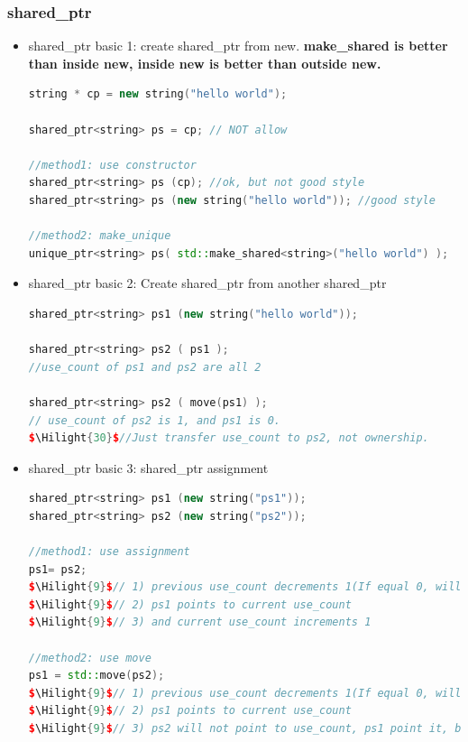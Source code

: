\documentclass[a4paper,12pt,twoside]{book}
\newcommand{\Hilight}[1]{\makebox[0pt][l]{\color{yellow}\rule[-3pt]{#1em}{11pt}}}
\begin{document}
\subsubsection{shared\_ptr}
\begin{itemize}

\item shared\_ptr basic 1: create shared\_ptr from new.    \textbf{make\_shared is better than inside new, inside new is better than outside new.}
\begin{lstlisting}[frame=single, language=c++]
string * cp = new string("hello world");

shared_ptr<string> ps = cp; // NOT allow

//method1: use constructor
shared_ptr<string> ps (cp); //ok, but not good style
shared_ptr<string> ps (new string("hello world")); //good style

//method2: make_unique
unique_ptr<string> ps( std::make_shared<string>("hello world") );
\end{lstlisting}

\item shared\_ptr basic 2: Create shared\_ptr from another shared\_ptr
\begin{lstlisting}[frame=single, language=c++, mathescape=true]
shared_ptr<string> ps1 (new string("hello world"));

shared_ptr<string> ps2 ( ps1 );
//use_count of ps1 and ps2 are all 2

shared_ptr<string> ps2 ( move(ps1) );
// use_count of ps2 is 1, and ps1 is 0.
$\Hilight{30}$//Just transfer use_count to ps2, not ownership.
\end{lstlisting}

\item shared\_ptr basic 3: shared\_ptr assignment
\begin{lstlisting}[frame=single, language=c++, mathescape=true]
shared_ptr<string> ps1 (new string("ps1"));
shared_ptr<string> ps2 (new string("ps2"));

//method1: use assignment
ps1= ps2;
$\Hilight{9}$// 1) previous use_count decrements 1(If equal 0, will delete)
$\Hilight{9}$// 2) ps1 points to current use_count
$\Hilight{9}$// 3) and current use_count increments 1

//method2: use move
ps1 = std::move(ps2);
$\Hilight{9}$// 1) previous use_count decrements 1(If equal 0, will delete)
$\Hilight{9}$// 2) ps1 points to current use_count
$\Hilight{9}$// 3) ps2 will not point to use_count, ps1 point it, but NOT increment 1



\end{lstlisting}
\end{itemize}
\end{document}
